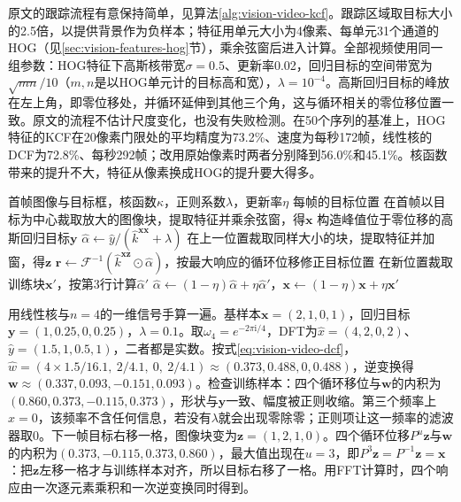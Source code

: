 原文的跟踪流程有意保持简单，见算法\ref{alg:vision-video-kcf}。跟踪区域取目标大小的2.5倍，以提供背景作为负样本；特征用单元大小为4像素、每单元31个通道的HOG（见\ref{sec:vision-features-hog}节），乘余弦窗后进入计算。全部视频使用同一组参数：HOG特征下高斯核带宽$\sigma=0.5$、更新率0.02，回归目标的空间带宽为$\sqrt{mn}/10$（$m,n$是以HOG单元计的目标高和宽），$\lambda=10^{-4}$。高斯回归目标的峰放在左上角，即零位移处，并循环延伸到其他三个角，这与循环相关的零位移位置一致。原文的流程不估计尺度变化，也没有失败检测。在50个序列的基准上，HOG特征的KCF在20像素门限处的平均精度为73.2\%、速度为每秒172帧，线性核的DCF为72.8\%、每秒292帧；改用原始像素时两者分别降到56.0\%和45.1\%。核函数带来的提升不大，特征从像素换成HOG的提升要大得多。

\begin{algorithm}[基于核相关滤波的跟踪]
  \label{alg:vision-video-kcf}
  \begin{algorithmic}[1]
    \Require 首帧图像与目标框，核函数$\kappa$，正则系数$\lambda$，更新率$\eta$
    \Ensure 每帧的目标位置
    \State 在首帧以目标为中心裁取放大的图像块，提取特征并乘余弦窗，得$\bm{x}$
    \State 构造峰值位于零位移的高斯回归目标$\bm{y}$
    \State $\widehat{\alpha}\gets\widehat{y}/(\widehat{k}^{\bm{xx}}+\lambda)$
      \State 在上一位置裁取同样大小的块，提取特征并加窗，得$\bm{z}$
      \State $\bm{r}\gets\mathcal{F}^{-1}(\widehat{k}^{\bm{xz}}\odot\widehat{\alpha})$，按最大响应的循环位移修正目标位置
      \State 在新位置裁取训练块$\bm{x}'$，按第3行计算$\widehat{\alpha}'$
      \State $\widehat{\alpha}\gets(1-\eta)\widehat{\alpha}+\eta\widehat{\alpha}'$，$\bm{x}\gets(1-\eta)\bm{x}+\eta\bm{x}'$
    \EndFor
  \end{algorithmic}
\end{algorithm}

用线性核与$n=4$的一维信号手算一遍。基样本$\bm{x}=(2,1,0,1)$，回归目标$\bm{y}=(1,0.25,0,0.25)$，$\lambda=0.1$。取$\omega_4=e^{-2\pi\mathrm{i}/4}$，DFT为$\widehat{x}=(4,2,0,2)$、$\widehat{y}=(1.5,1,0.5,1)$，二者都是实数。按式\eqref{eq:vision-video-dcf}，$\widehat{w}=(4\times1.5/16.1,\ 2/4.1,\ 0,\ 2/4.1)\approx(0.373,0.488,0,0.488)$，逆变换得$\bm{w}\approx(0.337,0.093,-0.151,0.093)$。检查训练样本：四个循环移位与$\bm{w}$的内积为$(0.860,0.373,-0.115,0.373)$，形状与$\bm{y}$一致、幅度被正则收缩。第三个频率上$\widehat{x}=0$，该频率不含任何信息，若没有$\lambda$就会出现零除零；正则项让这一频率的滤波器取0。下一帧目标右移一格，图像块变为$\bm{z}=(1,2,1,0)$。四个循环位移$P^u\bm{z}$与$\bm{w}$的内积为$(0.373,-0.115,0.373,0.860)$，最大值出现在$u=3$，即$P^3\bm{z}=P^{-1}\bm{z}=\bm{x}$：把$\bm{z}$左移一格才与训练样本对齐，所以目标右移了一格。用FFT计算时，四个响应由一次逐元素乘积和一次逆变换同时得到。

